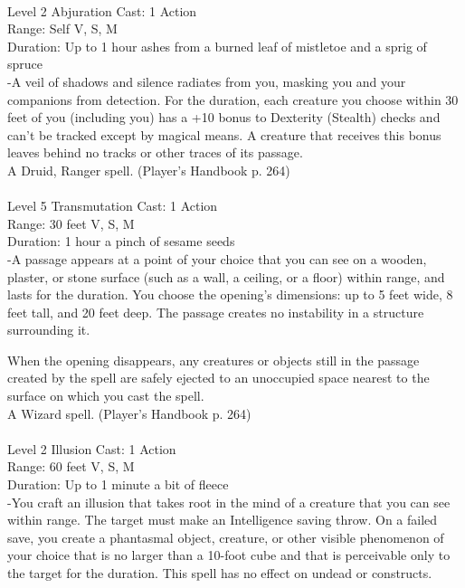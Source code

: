 \documentclass[10pt,twocolumn]{report}
\begin{document}
 \\
Level 2 \quad Abjuration \quad Cast: 1 Action\\
Range: Self \quad V, S, M\\
Duration: Up to 1 hour \quad ashes from a burned leaf of mistletoe and a sprig of spruce\\
-A veil of shadows and silence radiates from you, masking you and your companions from detection.
For the duration, each creature you choose within 30 feet of you (including you) has a +10 bonus to Dexterity (Stealth) checks and can’t be tracked except by magical means. A creature that receives this bonus leaves behind no tracks or other traces of its passage.\\
A Druid, Ranger spell. (Player's Handbook p. 264) \\


 \\
Level 5 \quad Transmutation \quad Cast: 1 Action\\
Range: 30 feet \quad V, S, M\\
Duration: 1 hour \quad a pinch of sesame seeds\\
-A passage appears at a point of your choice that you can see on a wooden, plaster, or stone surface (such as a wall, a ceiling, or a floor) within range, and lasts for the duration. You choose the opening’s dimensions: up to 5 feet wide, 8 feet tall, and 20 feet deep. The passage creates no instability in a structure surrounding it.

When the opening disappears, any creatures or objects still in the passage created by the spell are safely ejected to an unoccupied space nearest to the surface on which you cast the spell.\\
A Wizard spell. (Player's Handbook p. 264) \\


 \\
Level 2 \quad Illusion \quad Cast: 1 Action\\
Range: 60 feet \quad V, S, M\\
Duration: Up to 1 minute \quad a bit of fleece\\
-You craft an illusion that takes root in the mind of a creature that you can see within range.
The target must make an Intelligence saving throw. On a failed save, you create a phantasmal object, creature, or other visible phenomenon of your choice that is no larger than a 10-foot cube and that is perceivable only to the target for the duration. This spell has no effect on undead or constructs.
\end{document}
